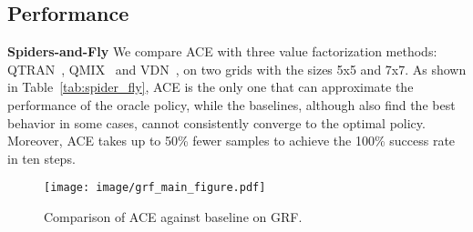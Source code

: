 \documentclass[letterpaper]{article} \usepackage{aaai23}  \usepackage{times}  \usepackage{helvet}  \usepackage{courier}  \usepackage[hyphens]{url}  \usepackage{graphicx} \urlstyle{rm} \def\UrlFont{\rm}  \usepackage{natbib}  \usepackage{caption} \frenchspacing  \setlength{\pdfpagewidth}{8.5in} \setlength{\pdfpageheight}{11in} \usepackage{algorithm}
\begin{document}
\vspace{-1ex}
\begin{table}[t!]
    \centering
    \vspace{-1ex}
    \caption{Comparison ACE against baselines on Spiders-and-Fly. Steps represent the gap between the average steps of the methods and the oracle policy. Samples represent the number of samples to achieve a 100\% success rate within 10 steps.}
    \label{tab:spider_fly}
\vspace{-4ex}
\end{table}



\subsection{Performance}
\vspace{-1ex}

\textbf{Spiders-and-Fly} 
We compare ACE with three value factorization methods: QTRAN~\citeyear{qtran}, QMIX~\citeyear{qmix} and VDN~\citeyear{vdn}, on two grids with the sizes 5x5 and 7x7. 
As shown in Table~\ref{tab:spider_fly}, ACE is the only one that can approximate the performance of the oracle policy, while the baselines, although also find the best behavior in some cases, cannot consistently converge to the optimal policy. 
Moreover, ACE takes up to 50\% fewer samples to achieve the 100\% success rate in ten steps.

\begin{figure}[t]
    \centering
    \texttt{[image: image/grf\_main\_figure.pdf]}
\vspace{-2ex}
    \caption{Comparison of ACE against baseline on GRF.
}
\label{fig:grf_main_figure}
\vspace{-4ex}
\end{figure}
\end{document}
